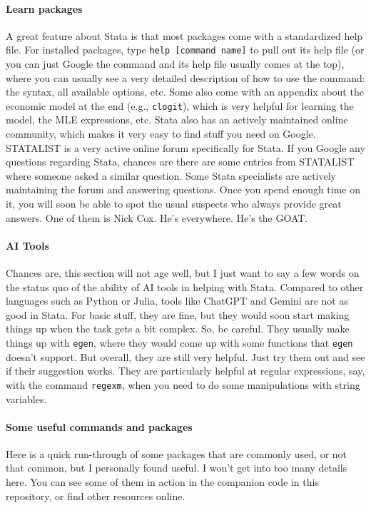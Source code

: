 \paragraph{Learn packages} A great feature about Stata is that most packages come with a standardized help file. For installed packages, type \verb|help [command name]| to pull out its help file (or you can just Google the command and its help file usually comes at the top), where you can usually see a very detailed description of how to use the command: the syntax, all available options, etc. Some also come with an appendix about the economic model at the end (e.g., \verb|clogit|), which is very helpful for learning the model, the MLE expressions, etc. Stata also has an actively maintained online community, which makes it very easy to find stuff you need on Google. STATALIST is a very active online forum specifically for Stata. If you Google any questions regarding Stata, chances are there are some entries from STATALIST where someone asked a similar question. Some Stata specialists are actively maintaining the forum and answering questions. Once you spend enough time on it, you will soon be able to spot the usual suspects who always provide great answers. One of them is Nick Cox. He's everywhere. He's the GOAT. 

\paragraph{AI Tools} Chances are, this section will not age well, but I just want to say a few words on the status quo of the ability of AI tools in helping with Stata. Compared to other languages such as Python or Julia, tools like ChatGPT and Gemini are not as good in Stata. For basic stuff, they are fine, but they would soon start making things up when the task gets a bit complex. So, be careful. They usually make things up with \verb|egen|, where they would come up with some functions that \verb|egen| doesn't support. But overall, they are still very helpful. Just try them out and see if their suggestion works. They are particularly helpful at regular expressions, say, with the command \verb|regexm|, when you need to do some manipulations with string variables. 

\paragraph{Some useful commands and packages} Here is a quick run-through of some packages that are commonly used, or not that common, but I personally found useful. I won't get into too many details here. You can see some of them in action in the companion code in this repository, or find other resources online. 

